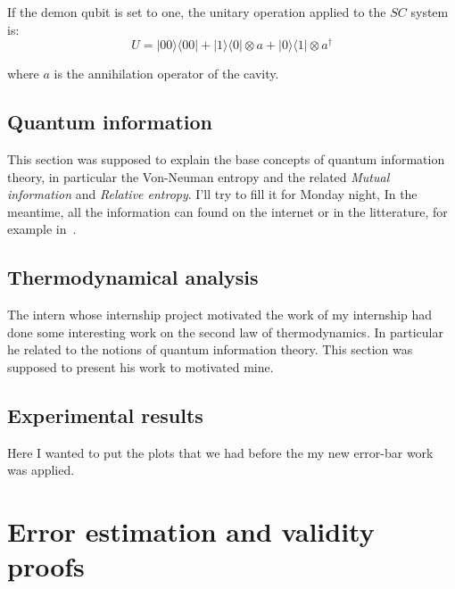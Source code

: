 \documentclass[10pt,a4paper]{report}
\theoremstyle{plain}
\theoremstyle{definition}
\theoremstyle{remark}
\newcommand{\ket}[1]{|#1\rangle}
\newcommand{\bra}[1]{\langle#1|}
\begin{document}
If the demon qubit is set to one, the unitary operation applied to the $SC$
system is:
\[U = \ket{00}\bra{00} + \ket 1 \bra 0 \otimes a + \ket 0 \bra 1 \otimes a^\dagger\]

where $a$ is the annihilation operator of the cavity.



\section{Quantum information}

This section was supposed to explain the base concepts of quantum information
theory, in particular the Von-Neuman entropy and the related \emph{Mutual
  information} and \emph{Relative entropy}. I'll try to fill it for Monday
night, In the meantime, all the information can found on the internet or in the
litterature, for example in~\cite{QCQI}.







\section{Thermodynamical analysis}

The intern whose internship project motivated the work of my internship had done
some interesting work on the second law of thermodynamics. In particular he
related to the notions of quantum information theory. This section was supposed
to present his work to motivated mine.

\section{Experimental results}

Here I wanted to put the plots that we had before the my new error-bar work was applied.

\chapter{Error estimation and validity proofs}
\end{document}
